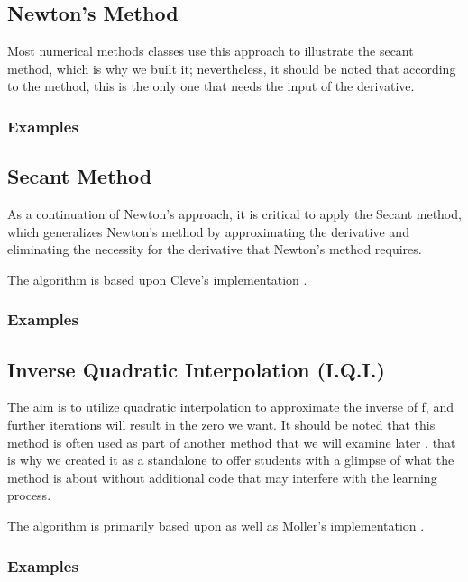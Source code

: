 \subsection{Newton's Method}
Most numerical methods classes use this approach to illustrate the secant method, which is why we built it; nevertheless, it should be noted that according to the method, this is the only one that needs the input of the derivative.
\subsubsection{Examples}
	


\subsection{Secant Method}
As a continuation of Newton's approach, it is critical to apply the Secant method, which generalizes Newton's method by approximating the derivative and eliminating the necessity for the derivative that Newton's method requires. 

The algorithm is based upon Cleve's implementation \cite{doi:10.1137/1.9780898717952}.
\subsubsection{Examples}
	

\subsection{Inverse Quadratic Interpolation (I.Q.I.)}
The aim is to utilize quadratic interpolation to approximate the inverse of f, and further iterations will result in the zero we want. It should be noted that this method is often used as part of another method that we will examine later \cite{10.5555/2553197}, that is why we created it as a standalone to offer students with a glimpse of what the method is about without additional code that may interfere with the learning process.

The algorithm is primarily based upon \cite{kreyszig11}  as well as Moller's implementation \cite{doi:10.1137/1.9780898717952}.
\subsubsection{Examples}
	


